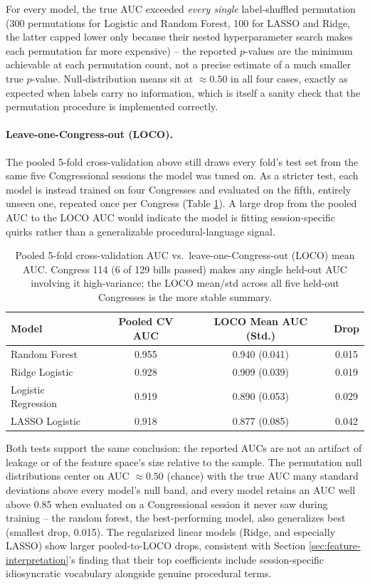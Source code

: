 For every model, the true AUC exceeded \emph{every single} label-shuffled permutation (300 permutations for Logistic and Random Forest, 100 for LASSO and Ridge, the latter capped lower only because their nested hyperparameter search makes each permutation far more expensive) -- the reported $p$-values are the minimum achievable at each permutation count, not a precise estimate of a much smaller true $p$-value. Null-distribution means sit at $\approx 0.50$ in all four cases, exactly as expected when labels carry no information, which is itself a sanity check that the permutation procedure is implemented correctly.

\paragraph{Leave-one-Congress-out (LOCO).} The pooled 5-fold cross-validation above still draws every fold's test set from the same five Congressional sessions the model was tuned on. As a stricter test, each model is instead trained on four Congresses and evaluated on the fifth, entirely unseen one, repeated once per Congress (Table \ref{tab:loco}). A large drop from the pooled AUC to the LOCO AUC would indicate the model is fitting session-specific quirks rather than a generalizable procedural-language signal.

\begin{table}[htbp]
\centering
\caption{Pooled 5-fold cross-validation AUC vs.\ leave-one-Congress-out (LOCO) mean AUC. Congress 114 (6 of 129 bills passed) makes any single held-out AUC involving it high-variance; the LOCO mean/std across all five held-out Congresses is the more stable summary.}
\label{tab:loco}
\begin{tabular}{lccc}
\toprule
\textbf{Model} & \textbf{Pooled CV AUC} & \textbf{LOCO Mean AUC (Std.)} & \textbf{Drop} \\
\midrule
Random Forest       & 0.955 & 0.940 (0.041) & 0.015 \\
Ridge Logistic      & 0.928 & 0.909 (0.039) & 0.019 \\
Logistic Regression & 0.919 & 0.890 (0.053) & 0.029 \\
LASSO Logistic      & 0.918 & 0.877 (0.085) & 0.042 \\
\bottomrule
\end{tabular}
\end{table}

Both tests support the same conclusion: the reported AUCs are not an artifact of leakage or of the feature space's size relative to the sample. The permutation null distributions center on AUC $\approx 0.50$ (chance) with the true AUC many standard deviations above every model's null band, and every model retains an AUC well above 0.85 when evaluated on a Congressional session it never saw during training -- the random forest, the best-performing model, also generalizes best (smallest drop, 0.015). The regularized linear models (Ridge, and especially LASSO) show larger pooled-to-LOCO drops, consistent with Section \ref{sec:feature-interpretation}'s finding that their top coefficients include session-specific idiosyncratic vocabulary alongside genuine procedural terms.
